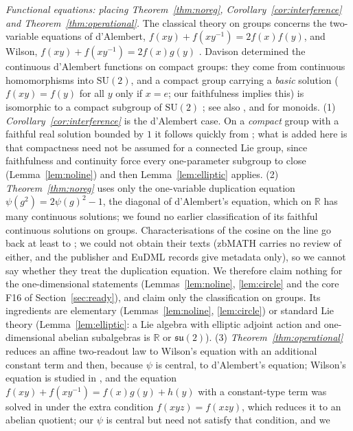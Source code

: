 \documentclass[11pt,reqno]{amsart}
\theoremstyle{definition}
\theoremstyle{remark}
\numberwithin{equation}{section}
\newcommand{\R}{\mathbb{R}}
\newcommand{\su}{\mathfrak{su}}
\newcommand{\SU}{\mathrm{SU}}
\begin{document}
\emph{Functional equations: placing Theorem~\ref{thm:noreg}, Corollary~\ref{cor:interference} and
Theorem~\ref{thm:operational}.}  The classical theory on groups concerns the two-variable equations of d'Alembert,
$f(xy)+f(xy^{-1})=2f(x)f(y)$, and Wilson, $f(xy)+f(xy^{-1})=2f(x)g(y)$ \cite{Stetkaer}.  Davison determined the continuous
d'Alembert functions on compact groups: they come from continuous homomorphisms into $\SU(2)$, and a compact group
carrying a \emph{basic} solution ($f(xy)=f(y)$ for all $y$ only if $x=e$; our faithfulness implies this) is isomorphic to a
compact subgroup of $\SU(2)$ \cite{Davison08}; see also \cite{Yang13}, and \cite{Davison09} for monoids.  (1) \emph{Corollary~\ref{cor:interference}} is the
d'Alembert case.  On a \emph{compact} group with a faithful real solution bounded by $1$ it follows quickly from
\cite{Davison08}; what is added here is that compactness need not be assumed for a connected Lie group, since
faithfulness and continuity force every one-parameter subgroup to close (Lemma~\ref{lem:noline}) and then
Lemma~\ref{lem:elliptic} applies.  (2) \emph{Theorem~\ref{thm:noreg}} uses only the one-variable duplication equation
$\psi(g^2)=2\psi(g)^2-1$, the diagonal of d'Alembert's equation, which on $\R$ has many continuous solutions; we found no
earlier classification of its faithful continuous solutions on groups.  Characterisations of the cosine on the line go back at least to
\cite{Kuczma64,Sharkovskii73}; we could not obtain their texts (zbMATH carries no review of either, and the publisher and
EuDML records give metadata only), so we cannot say whether they treat the duplication equation.  We therefore claim
nothing for the one-dimensional statements (Lemmas~\ref{lem:noline}, \ref{lem:circle} and the core F16 of
Section~\ref{sec:ready}), and claim only the classification on groups.  Its ingredients are elementary
(Lemmas~\ref{lem:noline}, \ref{lem:circle}) or standard Lie theory (Lemma~\ref{lem:elliptic}: a Lie algebra with elliptic
adjoint action and one-dimensional abelian subalgebras is $\R$ or $\su(2)$).  (3) \emph{Theorem~\ref{thm:operational}}
reduces an affine two-readout law to Wilson's equation with an additional constant term and then, because $\psi$ is
central, to d'Alembert's equation; Wilson's equation is studied in \cite{Stetkaer,EbanksStetkaer15}, and the equation
$f(xy)+f(xy^{-1})=f(x)g(y)+h(y)$ with a constant-type term was solved in \cite[Lemma~1]{CENSZ95} under the extra condition
$f(xyz)=f(xzy)$, which reduces it to an abelian quotient; our $\psi$ is central but need not satisfy that condition, and we
\end{document}
